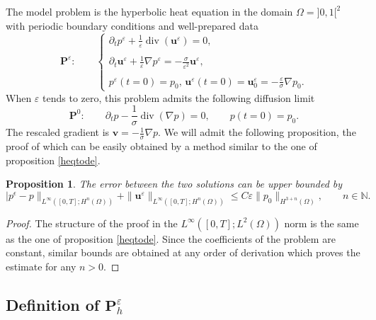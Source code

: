 \documentclass[a4paper,french,english,10pt]{article}
\newcommand\uu{\mathbf{u}}
\newcommand\eps{\varepsilon}
\newcommand{\ds}{\displaystyle}
\newtheorem{proposition}[theorem]{Proposition}
\begin{document}
The model problem is the hyperbolic heat equation in the domain
$\Omega= ]0,1[^2$
with periodic boundary conditions and  well-prepared data
\begin{equation*}\label{HHE!}
\mathbf P^\eps: \qquad 
\left\{\begin{array}{l}
\ds\partial_t p^{\eps}+\frac{1}{\eps}\operatorname{div}(\uu^{\eps})=0,\\
\\
\ds\partial_t \uu^{\eps}+\frac{1}{\eps}\nabla
p^{\eps}=-\frac{\sigma}{\eps^2}\uu^{\eps},\\
\\
p^{\eps}(t=0)=p_0\mbox{,  }\uu^{\eps}(t=0)=\uu^{\eps}_0=
-\frac{\eps}\sigma
\nabla p_0.
 \end{array}\right.
\end{equation*}
When $\eps$ tends to zero,
this problem  admits the following diffusion  limit
\begin{equation*}\label{HHE!lim}
\mathbf P^0: \qquad
\ds\partial_t p-\frac{1}{\sigma}\operatorname{div}(\nabla{p})=0
, \qquad 
p(t=0)=p_0.  
\end{equation*}
The rescaled gradient is 
$
\mathbf v=-\frac{1}{\sigma} \nabla{p}$.
We will admit the following proposition, the proof of which can be easily obtained 
by a method similar to the one of proposition
\ref{heqtode}.

\begin{proposition}\label{heqtode2d}
The error between the two solutions
can be  upper bounded by
\begin{equation}\label{ine3}
| p^\epsilon-p\|_{   L^\infty([0,T];H^n(\Omega))  }+
\| \uu^\eps 
 \|_{   L^\infty([0,T]; H^n(\Omega))  }
 \leq
C \eps
\|p_0 \|_{H^{3+n}(\Omega)},
\qquad n \in \mathbb N.
\end{equation}
\end{proposition}
\begin{proof}
The structure of the 
proof in the $L^\infty( [0,T];L^2(\Omega))$ norm is the same as the one
of proposition \ref{heqtode}.
Since the coefficients of the problem are constant, similar bounds are obtained
at any order of derivation which proves the estimate for any $n>0$.
\end{proof}


\subsection{Definition of $\mathbf P_h^\eps$}
\end{document}
